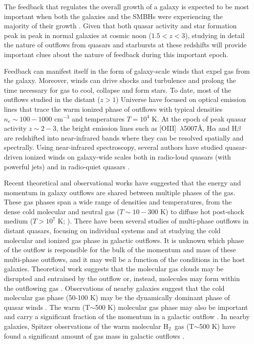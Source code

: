 \documentclass[twocolumn]{aastex63}
\newcommand{\oiii}{[O{\sc III}]\xspace}
\newcommand{\htwo}{H$_{2}$}
\begin{document}
The feedback that regulates the overall growth of a galaxy is expected to be most important when both the galaxies and the SMBHs were experiencing the majority of their growth \citep{Zubovas12,Choi12,Barai17,Costa18}. Given that both quasar activity and star formation peak in peak in normal galaxies at cosmic noon  ($1.5<z<3$), studying in detail the nature of outflows from quasars and starbursts at these redshifts will provide important clues about the nature of feedback during this important epoch.

Feedback can manifest itself in the form of galaxy-scale winds that expel gas from the galaxy. Moreover, winds can drive shocks and turbulence and prolong the time necessary for gas to cool, collapse and form stars. To date, most of the outflows studied in the distant ($z>1$) Universe have focused on optical emission lines that trace the warm ionized phase of outflows with typical densities $n_e\sim 100-1000$ cm$^{-3}$ and temperatures $T=10^4$ K. At the epoch of peak quasar activity $z\sim 2-3$, the bright emission lines such as \oiii\ $\lambda$5007\AA, H$\alpha$ and H$\beta$ are redshifted into near-infrared bands where they can be resolved spatially and spectrally. Using near-infrared spectroscopy, several authors have studied quasar-driven ionized winds on galaxy-wide scales both in radio-loud quasars (with powerful jets) and in radio-quiet quasars \citep{Nesvadba08,Cano-Diaz12,Carniani15,Vayner17,Vayner21,Kakkad20}.

Recent theoretical and observational works have suggested that the energy and momentum in galaxy outflows are shared between multiple phases of the gas. These gas phases span a wide range of densities and temperatures, from the dense cold molecular and neutral gas ($T\sim10-300$ K) to diffuse hot post-shock medium ($T>10^7$ K; \citealt{Crichton16,Hall19}). There have been several studies of multi-phase outflows in distant quasars, focusing on individual systems \citep{Vayner17,Brusa18,Herrera-Camus19} and at studying the cold molecular and ionized gas phase in galactic outflows. It is unknown which phase of the outflow is responsible for the bulk of the momentum and mass of these multi-phase outflows, and it may well be a function of the conditions in the host galaxies. Theoretical work suggests that the molecular gas clouds may be disrupted and entrained by the outflow \citep{Scannapieco15} or, instead, molecules may form within the outflowing gas \citep{Richings18}. Observations of nearby galaxies suggest that the cold molecular gas phase (50-100 K) may be the dynamically dominant phase of quasar winds \citep{Sun14,Cicone14,Alatalo11,Aalto12,Feruglio13,Morganti13,Veilleux17,Fiore17}. The warm (T$\sim$500 K) molecular gas phase may also be important and carry a significant fraction of the momentum in a galactic outflow \citep{Richings18}. In nearby galaxies, Spitzer observations of the warm molecular \htwo\ gas (T$\sim$500 K) have found a significant amount of gas mass in galactic outflows \citep{Beirao15,Dasyra14,Rogemar20}. 
\end{document}
